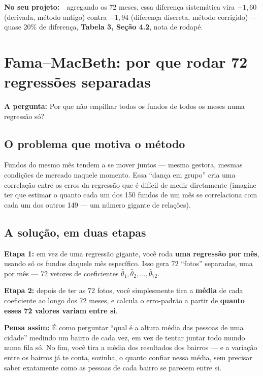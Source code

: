 \documentclass[11pt,a4paper]{article}
\newcommand{\pergunta}[1]{\par\vspace{4pt}\noindent\textbf{\color{azul}A pergunta:} #1\par\vspace{2pt}}
\newcommand{\analogia}[1]{\par\vspace{4pt}\noindent\textbf{\color{verde}Pensa assim:} #1\par\vspace{2pt}}
\newcommand{\noprojeto}[0]{\par\vspace{4pt}\noindent\textbf{No seu projeto:}\ }
\begin{document}
\noprojeto\ agregando os 72 meses, essa diferença sistemática vira $-1{,}60$ (derivada, método
antigo) contra $-1{,}94$ (diferença discreta, método corrigido) --- quase 20\% de diferença,
\textbf{Tabela 3, Seção 4.2}, nota de rodapé.

\section{Fama--MacBeth: por que rodar 72 regressões separadas}
\label{sec:fm}

\pergunta{Por que não empilhar todos os fundos de todos os meses numa regressão só?}

\subsection{O problema que motiva o método}

Fundos do mesmo mês tendem a se mover juntos --- mesma gestora, mesmas condições de mercado
naquele momento. Essa ``dança em grupo'' cria uma correlação entre os erros da regressão que é
difícil de medir diretamente (imagine ter que estimar o quanto cada um dos 150 fundos de um mês
se correlaciona com cada um dos outros 149 --- um número gigante de relações).

\subsection{A solução, em duas etapas}

\textbf{Etapa 1:} em vez de uma regressão gigante, você roda \textbf{uma regressão por mês},
usando só os fundos daquele mês específico. Isso gera 72 ``fotos'' separadas, uma por mês --- 72
vetores de coeficientes $\widehat\theta_1, \widehat\theta_2, \dots, \widehat\theta_{72}$.

\textbf{Etapa 2:} depois de ter as 72 fotos, você simplesmente tira a \textbf{média} de cada
coeficiente ao longo dos 72 meses, e calcula o erro-padrão a partir de \textbf{quanto esses 72
valores variam entre si}.

\analogia{É como perguntar ``qual é a altura média das pessoas de uma cidade'' medindo um bairro
de cada vez, em vez de tentar juntar todo mundo numa fila só. No fim, você tira a média dos
resultados dos bairros --- e a variação entre os bairros já te conta, sozinha, o quanto confiar
nessa média, sem precisar saber exatamente como as pessoas de cada bairro se parecem entre si.}
\end{document}
